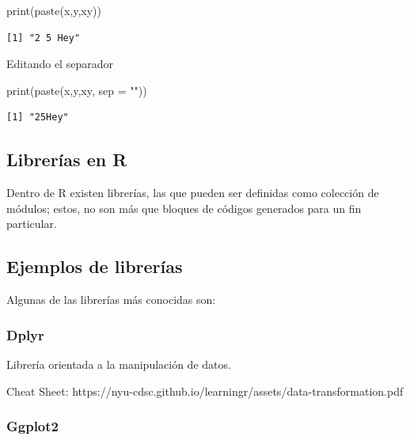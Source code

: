 \documentclass[
  letterpaper,
  DIV=11,
  numbers=noendperiod]{scrartcl}
\newenvironment{Shaded}{\begin{snugshade}}{\end{snugshade}}
\newcommand{\AttributeTok}[1]{\textcolor[rgb]{0.40,0.45,0.13}{#1}}
\newcommand{\FunctionTok}[1]{\textcolor[rgb]{0.28,0.35,0.67}{#1}}
\newcommand{\NormalTok}[1]{\textcolor[rgb]{0.00,0.23,0.31}{#1}}
\newcommand{\StringTok}[1]{\textcolor[rgb]{0.13,0.47,0.30}{#1}}
\begin{document}
\begin{Shaded}
\begin{Highlighting}[]
\FunctionTok{print}\NormalTok{(}\FunctionTok{paste}\NormalTok{(x,y,xy))}
\end{Highlighting}
\end{Shaded}

\begin{verbatim}
[1] "2 5 Hey"
\end{verbatim}

Editando el separador

\begin{Shaded}
\begin{Highlighting}[]
\FunctionTok{print}\NormalTok{(}\FunctionTok{paste}\NormalTok{(x,y,xy, }\AttributeTok{sep =} \StringTok{""}\NormalTok{))}
\end{Highlighting}
\end{Shaded}

\begin{verbatim}
[1] "25Hey"
\end{verbatim}

\subsection{Librerías en R}\label{libreruxedas-en-r}

Dentro de R existen librerías, las que pueden ser definidas como
colección de módulos; estos, no son más que bloques de códigos generados
para un fin particular.

\subsection{Ejemplos de librerías}\label{ejemplos-de-libreruxedas}

Algunas de las librerías más conocidas son:

\subsubsection{\texorpdfstring{\textbf{Dplyr}}{Dplyr}}\label{dplyr}

Librería orientada a la manipulación de datos.

Cheat Sheet:
https://nyu-cdsc.github.io/learningr/assets/data-transformation.pdf

\subsubsection{\texorpdfstring{\textbf{Ggplot2}}{Ggplot2}}\label{ggplot2}
\end{document}

